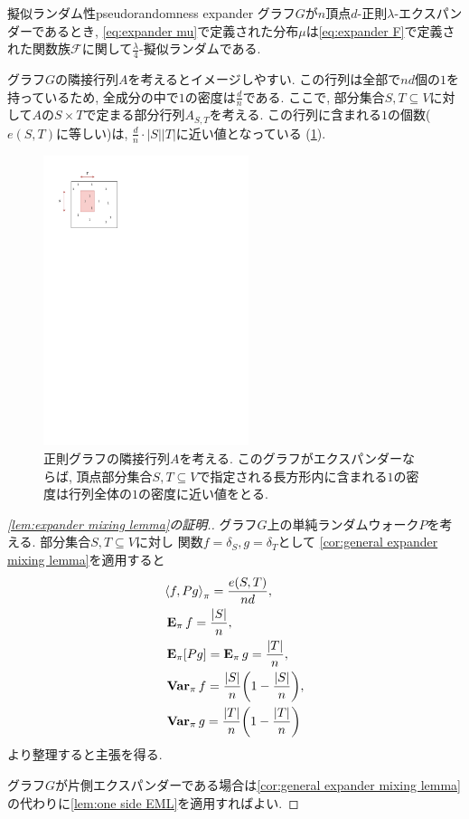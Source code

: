 \begin{corollary}{擬似ランダム性}{pseudorandomness expander}
    グラフ$G$が$n$頂点$d$-正則$\lambda$-エクスパンダーであるとき, \cref{eq:expander mu}で定義された分布$\mu$は\cref{eq:expander F}で定義された関数族$\mathcal{F}$に関して$\frac{\lambda}{4}$-擬似ランダムである.
\end{corollary}
%
グラフ$G$の隣接行列$A$を考えるとイメージしやすい.
この行列は全部で$nd$個の$1$を持っているため, 全成分の中で$1$の密度は$\frac{d}{n}$である.
ここで, 部分集合$S,T\subseteq V$に対して$A$の$S\times T$で定まる部分行列$A_{S,T}$を考える.
この行列に含まれる$1$の個数($e(S,T)$に等しい)は, $\frac{d}{n}\cdot |S||T|$に近い値となっている (\cref{fig:EML}).
\begin{figure}[htbp]
    \begin{center}
        \includegraphics[width=6cm]{images/EML.pdf}
        \caption{正則グラフの隣接行列$A$を考える. このグラフがエクスパンダーならば, 頂点部分集合$S,T\subseteq V$で指定される長方形内に含まれる$1$の密度は行列全体の$1$の密度に近い値をとる. \label{fig:EML}}
    \end{center}
\end{figure}
%
\begin{proof}[\cref{lem:expander mixing lemma}の証明.]
    グラフ$G$上の単純ランダムウォーク$P$を考える.
    部分集合$S,T\subseteq V$に対し
    関数$f=\delta_S,g=\delta_T$として
    \cref{cor:general expander mixing lemma}を適用すると
    \begin{align*}
         & \piprod{f,Pg} = \frac{e(S,T)}{nd},               \\
         & \Epi f = \frac{|S|}{n},                          \\
         & \Epi [Pg] = \Epi g = \frac{|T|}{n},              \\
         & \Varpi f = \frac{|S|}{n}\rbra*{1-\frac{|S|}{n}}, \\
         & \Varpi g = \frac{|T|}{n}\rbra*{1-\frac{|T|}{n}}
    \end{align*}
    より整理すると主張を得る.

    グラフ$G$が片側エクスパンダーである場合は\cref{cor:general expander mixing lemma}の代わりに\cref{lem:one side EML}を適用すればよい.
\end{proof}
